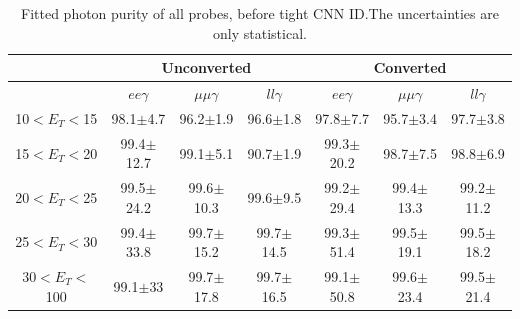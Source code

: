 \begin{table}[htbp]
\raggedleft
\begin{longtable}[c]{ccccccc}
\hline\hline
                             & \multicolumn{3}{c}{Unconverted}               & \multicolumn{3}{c}{Converted}                \\
                            \hline
\endfirsthead
%
\endhead
%
                             & $ee\gamma$           & $\mu\mu\gamma$           & $ll\gamma$           & $ee\gamma$           &  $\mu\mu\gamma$          & $ll\gamma$           \\
    \hline
10$<E_T<$15 & 98.1$\pm$4.7   &   96.2$\pm$1.9   &   96.6$\pm$1.8   &   97.8$\pm$7.7   &   95.7$\pm$3.4    &   97.7$\pm$3.8  \\
15$<E_T<$20 & 99.4$\pm$12.7  &   99.1$\pm$5.1   &   90.7$\pm$1.9   &   99.3$\pm$20.2  &   98.7$\pm$7.5    &   98.8$\pm$6.9  \\
20$<E_T<$25 & 99.5$\pm$24.2  &   99.6$\pm$10.3  &   99.6$\pm$9.5   &   99.2$\pm$29.4  &   99.4$\pm$13.3   &   99.2$\pm$11.2 \\
25$<E_T<$30 & 99.4$\pm$33.8  &   99.7$\pm$15.2  &   99.7$\pm$14.5  &   99.3$\pm$51.4  &   99.5$\pm$19.1   &   99.5$\pm$18.2    \\
30$<E_T<$100 & 99.1$\pm$33   &   99.7$\pm$17.8  &   99.7$\pm$16.5  &   99.1$\pm$50.8  &   99.6$\pm$23.4   &   99.5$\pm$21.4 \\
\hline\hline
\end{longtable}
\caption{Fitted photon purity of all probes, before tight CNN ID.The uncertainties are only statistical.}
\label{tab:gamma:CNN:Zllg:Purity:B}
\end{table}

